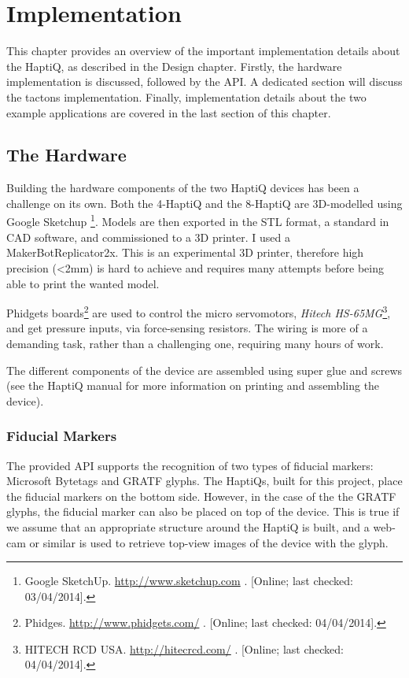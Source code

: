 \chapter{Implementation}

This chapter provides an overview of the important implementation details about the HaptiQ, as described in the Design chapter. 
Firstly, the hardware implementation is discussed, followed by the API. A dedicated section will discuss the tactons implementation. Finally, implementation details about the two example applications are covered in the last section of this chapter.

\section{The Hardware}

Building the hardware components of the two HaptiQ devices has been a challenge on its own. Both the 4-HaptiQ and the 8-HaptiQ are 3D-modelled using Google Sketchup \footnote{Google SketchUp. \url{http://www.sketchup.com} . [Online; last checked: 03/04/2014].}. Models are then exported in the STL format, a standard in CAD software, and commissioned to a 3D printer. I used a MakerBot\textregistered   Replicator\texttrademark 2x. This is an experimental 3D printer, therefore high precision (\textless 2mm) is hard to achieve and requires many attempts before being able to print the wanted model. 

Phidgets boards\footnote{Phidges. \url{http://www.phidgets.com/} . [Online; last checked: 04/04/2014].} are used to control the micro servomotors, \textit{Hitech HS-65MG}\footnote{HITECH RCD USA. \url{http://hitecrcd.com/} . [Online; last checked: 04/04/2014].}, and get pressure inputs, via force-sensing resistors. The wiring is more of a demanding task, rather than a challenging one, requiring many hours of work.

The different components of the device are assembled using super glue and screws (see the HaptiQ manual for more information on printing and assembling the device). 

\subsection{Fiducial Markers}

The provided API supports the recognition of two types of fiducial markers: Microsoft Bytetags and GRATF glyphs. The HaptiQs, built for this project, place the fiducial markers on the bottom side. However, in the case of the the GRATF glyphs, the fiducial marker can also be placed on top of the device. This is true if we assume that an appropriate structure around the HaptiQ is built, and a web-cam or similar is used to retrieve top-view images of the device with the glyph.

